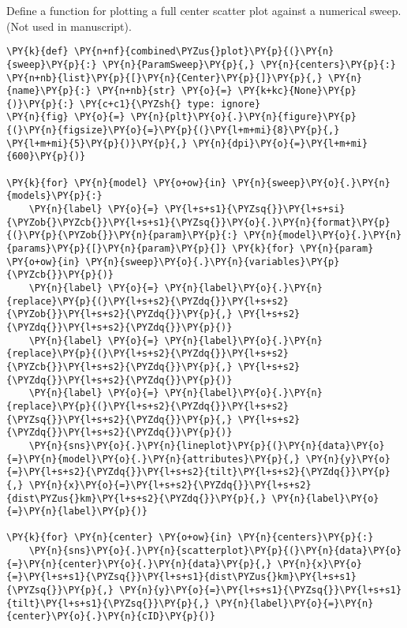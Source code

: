 Define a function for plotting a full center scatter plot against a
numerical sweep. (Not used in manuscript).

\begin{tcolorbox}[breakable, size=fbox, boxrule=1pt, pad at break*=1mm,colback=cellbackground, colframe=cellborder]
\begin{Verbatim}[commandchars=\\\{\}]
\PY{k}{def} \PY{n+nf}{combined\PYZus{}plot}\PY{p}{(}\PY{n}{sweep}\PY{p}{:} \PY{n}{ParamSweep}\PY{p}{,} \PY{n}{centers}\PY{p}{:} \PY{n+nb}{list}\PY{p}{[}\PY{n}{Center}\PY{p}{]}\PY{p}{,} \PY{n}{name}\PY{p}{:} \PY{n+nb}{str} \PY{o}{=} \PY{k+kc}{None}\PY{p}{)}\PY{p}{:} \PY{c+c1}{\PYZsh{} type: ignore}
\PY{n}{fig} \PY{o}{=} \PY{n}{plt}\PY{o}{.}\PY{n}{figure}\PY{p}{(}\PY{n}{figsize}\PY{o}{=}\PY{p}{(}\PY{l+m+mi}{8}\PY{p}{,} \PY{l+m+mi}{5}\PY{p}{)}\PY{p}{,} \PY{n}{dpi}\PY{o}{=}\PY{l+m+mi}{600}\PY{p}{)}

\PY{k}{for} \PY{n}{model} \PY{o+ow}{in} \PY{n}{sweep}\PY{o}{.}\PY{n}{models}\PY{p}{:}
    \PY{n}{label} \PY{o}{=} \PY{l+s+s1}{\PYZsq{}}\PY{l+s+si}{\PYZob{}\PYZcb{}}\PY{l+s+s1}{\PYZsq{}}\PY{o}{.}\PY{n}{format}\PY{p}{(}\PY{p}{\PYZob{}}\PY{n}{param}\PY{p}{:} \PY{n}{model}\PY{o}{.}\PY{n}{params}\PY{p}{[}\PY{n}{param}\PY{p}{]} \PY{k}{for} \PY{n}{param} \PY{o+ow}{in} \PY{n}{sweep}\PY{o}{.}\PY{n}{variables}\PY{p}{\PYZcb{}}\PY{p}{)}
    \PY{n}{label} \PY{o}{=} \PY{n}{label}\PY{o}{.}\PY{n}{replace}\PY{p}{(}\PY{l+s+s2}{\PYZdq{}}\PY{l+s+s2}{\PYZob{}}\PY{l+s+s2}{\PYZdq{}}\PY{p}{,} \PY{l+s+s2}{\PYZdq{}}\PY{l+s+s2}{\PYZdq{}}\PY{p}{)}
    \PY{n}{label} \PY{o}{=} \PY{n}{label}\PY{o}{.}\PY{n}{replace}\PY{p}{(}\PY{l+s+s2}{\PYZdq{}}\PY{l+s+s2}{\PYZcb{}}\PY{l+s+s2}{\PYZdq{}}\PY{p}{,} \PY{l+s+s2}{\PYZdq{}}\PY{l+s+s2}{\PYZdq{}}\PY{p}{)}
    \PY{n}{label} \PY{o}{=} \PY{n}{label}\PY{o}{.}\PY{n}{replace}\PY{p}{(}\PY{l+s+s2}{\PYZdq{}}\PY{l+s+s2}{\PYZsq{}}\PY{l+s+s2}{\PYZdq{}}\PY{p}{,} \PY{l+s+s2}{\PYZdq{}}\PY{l+s+s2}{\PYZdq{}}\PY{p}{)}
    \PY{n}{sns}\PY{o}{.}\PY{n}{lineplot}\PY{p}{(}\PY{n}{data}\PY{o}{=}\PY{n}{model}\PY{o}{.}\PY{n}{attributes}\PY{p}{,} \PY{n}{y}\PY{o}{=}\PY{l+s+s2}{\PYZdq{}}\PY{l+s+s2}{tilt}\PY{l+s+s2}{\PYZdq{}}\PY{p}{,} \PY{n}{x}\PY{o}{=}\PY{l+s+s2}{\PYZdq{}}\PY{l+s+s2}{dist\PYZus{}km}\PY{l+s+s2}{\PYZdq{}}\PY{p}{,} \PY{n}{label}\PY{o}{=}\PY{n}{label}\PY{p}{)}

\PY{k}{for} \PY{n}{center} \PY{o+ow}{in} \PY{n}{centers}\PY{p}{:}
    \PY{n}{sns}\PY{o}{.}\PY{n}{scatterplot}\PY{p}{(}\PY{n}{data}\PY{o}{=}\PY{n}{center}\PY{o}{.}\PY{n}{data}\PY{p}{,} \PY{n}{x}\PY{o}{=}\PY{l+s+s1}{\PYZsq{}}\PY{l+s+s1}{dist\PYZus{}km}\PY{l+s+s1}{\PYZsq{}}\PY{p}{,} \PY{n}{y}\PY{o}{=}\PY{l+s+s1}{\PYZsq{}}\PY{l+s+s1}{tilt}\PY{l+s+s1}{\PYZsq{}}\PY{p}{,} \PY{n}{label}\PY{o}{=}\PY{n}{center}\PY{o}{.}\PY{n}{cID}\PY{p}{)}


\end{Verbatim}
\end{tcolorbox}
